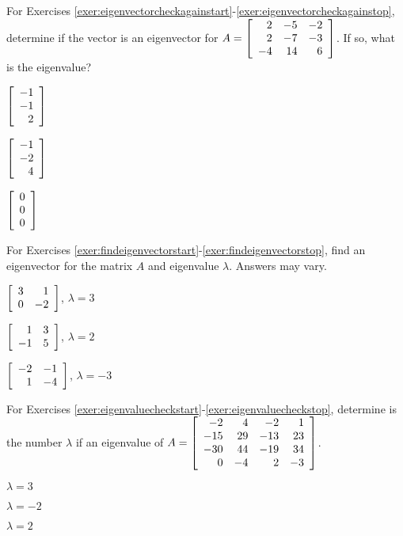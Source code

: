 \noindent For Exercises \ref{exer:eigenvectorcheckagainstart}-\ref{exer:eigenvectorcheckagainstop}, determine if the vector is an eigenvector for $A = \mtx{rrr}{2&-5&-2\\2&-7&-3\\-4&14&6}$. If so, what is the eigenvalue?
\begin{enumerate}[!HW!, label=$\spadesuit$ \arabic*., ref=\arabic*]
\begin{multicols}{3}
\item\label{exer:eigenvectorcheckagainstart} $\vr{-1\\-1\\2}$ 
\item $\vr{-1\\-2\\4}$ 
\item\label{exer:eigenvectorcheckagainstop} $\vr{0\\0\\0}$
\end{multicols}
\end{enumerate}

\noindent For Exercises \ref{exer:findeigenvectorstart}-\ref{exer:findeigenvectorstop}, find an eigenvector for the matrix $A$ and eigenvalue $\lambda$. Answers may vary.
\begin{enumerate}[!HW!, label=$\spadesuit$ \arabic*., ref=\arabic*]
\begin{multicols}{3}
\item\label{exer:findeigenvectorstart} $\mtx{rr}{3&1\\0&-2}$, $\lambda =3$ 
\item $\mtx{rr}{1&3\\-1&5}$, $\lambda = 2$ 
\item\label{exer:findeigenvectorstop} $\mtx{rr}{-2&-1\\1&-4}$, $\lambda=-3$ 
\end{multicols}
\end{enumerate}

\noindent For Exercises \ref{exer:eigenvaluecheckstart}-\ref{exer:eigenvaluecheckstop}, determine is the number $\lambda$ if an eigenvalue of $A = \mtx{rrrr}{-2&4&-2&1\\-15&29&-13&23\\-30&44&-19&34\\0&-4&2&-3}$.
\begin{enumerate}[!HW!, label=$\spadesuit$ \arabic*., ref=\arabic*]
\begin{multicols}{3}
\item\label{exer:eigenvaluecheckstart} $\lambda = 3$ 
\item $\lambda = -2$
\item\label{exer:eigenvaluecheckstop} $\lambda = 2$ 
\end{multicols}
\end{enumerate}

